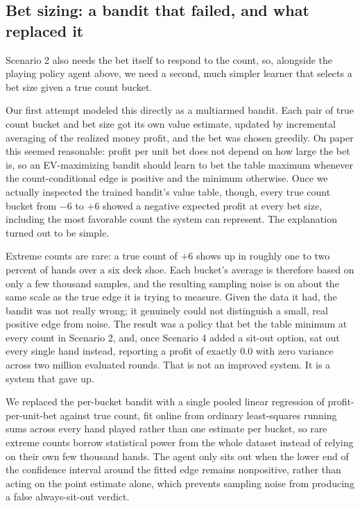 \documentclass[conference,a4paper]{IEEEtran}
\begin{document}
\subsection{Bet sizing: a bandit that failed, and what replaced it}
\label{sec:betting}
Scenario 2 also needs the bet itself to respond to the count, so, alongside the playing policy agent above, we need a second, much simpler learner that selects a bet size given a true count bucket.

Our first attempt modeled this directly as a multiarmed bandit. Each pair of true count bucket and bet size got its own value estimate, updated by incremental averaging of the realized money profit, and the bet was chosen greedily. On paper this seemed reasonable: profit per unit bet does not depend on how large the bet is, so an EV-maximizing bandit should learn to bet the table maximum whenever the count-conditional edge is positive and the minimum otherwise. Once we actually inspected the trained bandit's value table, though, every true count bucket from $-6$ to $+6$ showed a negative expected profit at every bet size, including the most favorable count the system can represent. The explanation turned out to be simple.

Extreme counts are rare: a true count of $+6$ shows up in roughly one to two percent of hands over a six deck shoe. Each bucket's average is therefore based on only a few thousand samples, and the resulting sampling noise is on about the same scale as the true edge it is trying to measure. Given the data it had, the bandit was not really wrong; it genuinely could not distinguish a small, real positive edge from noise. The result was a policy that bet the table minimum at every count in Scenario 2, and, once Scenario 4 added a sit-out option, sat out every single hand instead, reporting a profit of exactly $0.0$ with zero variance across two million evaluated rounds. That is not an improved system. It is a system that gave up.

We replaced the per-bucket bandit with a single pooled linear regression of profit-per-unit-bet against true count, fit online from ordinary least-squares running sums across every hand played rather than one estimate per bucket, so rare extreme counts borrow statistical power from the whole dataset instead of relying on their own few thousand hands. The agent only sits out when the lower end of the confidence interval around the fitted edge remains nonpositive, rather than acting on the point estimate alone, which prevents sampling noise from producing a false always-sit-out verdict.
\end{document}
